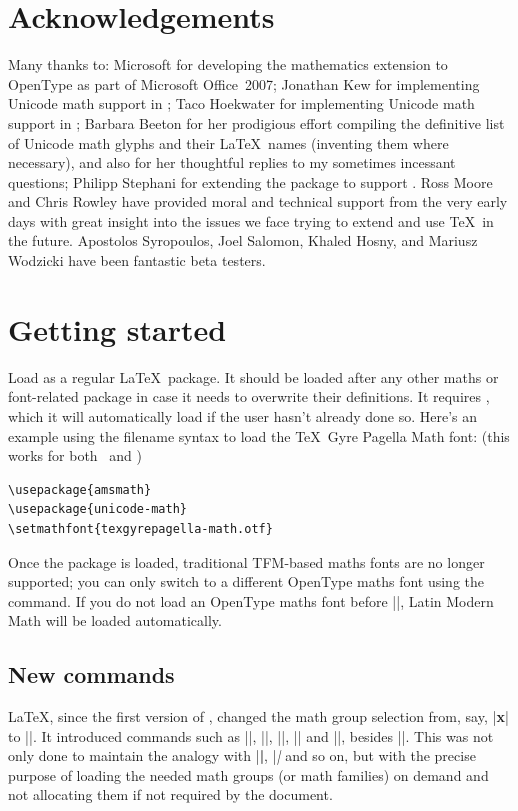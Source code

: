 \section{Acknowledgements}

Many thanks to:
Microsoft for developing the mathematics extension to OpenType as part of
Microsoft Office~2007;
Jonathan Kew for implementing Unicode math support in \XeTeX;
Taco Hoekwater for implementing Unicode math support in \LuaTeX;
Barbara Beeton for her prodigious effort compiling the definitive list of Unicode math
glyphs and their \LaTeX\ names (inventing them where necessary), and also
for her thoughtful replies to my sometimes incessant questions;
Philipp Stephani for extending the package to support \LuaTeX.
Ross Moore and Chris Rowley have provided moral and technical support
from the very early days with great insight into the issues we face trying
to extend and use \TeX\ in the future.
Apostolos Syropoulos, Joel Salomon, Khaled Hosny, and Mariusz Wodzicki
have been fantastic beta testers.

\section{Getting started}

Load  as a regular \LaTeX\ package.
It should be loaded after any other maths or font-related package in case it needs to overwrite their definitions.
It requires , which it will automatically load if the user hasn't already done so.
Here's an example using the filename syntax to load the \TeX\ Gyre Pagella Math font: (this works for both \XeLaTeX\ and \LuaLaTeX)
\begin{Verbatim}
\usepackage{amsmath}
\usepackage{unicode-math}
\setmathfont{texgyrepagella-math.otf}
\end{Verbatim}

Once the package is loaded, traditional TFM-based maths fonts are no longer supported;
you can only switch to a different OpenType maths font using the  command.
If you do not load an OpenType maths font before ||, Latin Modern Math will be loaded automatically.


\subsection{New commands}
\LaTeX, since the first version of \LaTeXe, changed the math group
selection from, say, |{\bf x}| to ||. It introduced commands
such as |\mathbf|, |\mathit|, |\mathsf|, |\mathtt| and |\mathcal|,
besides |\mathnormal|.  This was not only done to maintain the analogy
with |\textbf|, |\textit| and so on, but with the precise purpose of
loading the needed math groups (or math families) on demand and not
allocating them if not required by the document.

